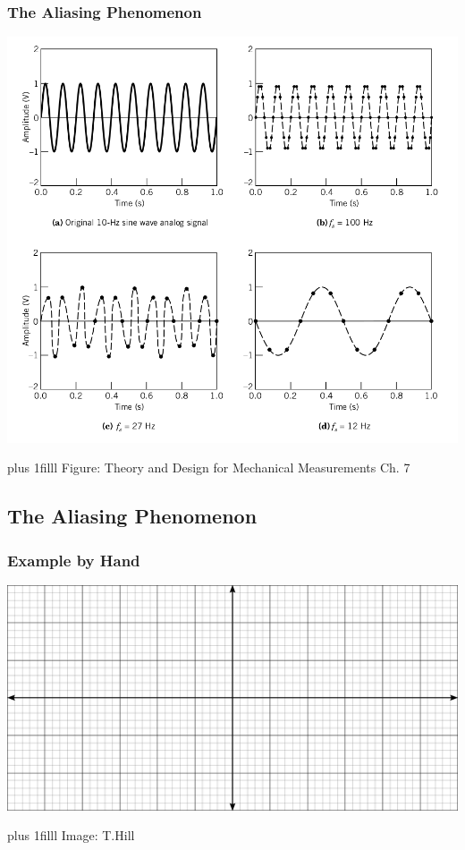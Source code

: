 \documentclass[fleqn]{beamer} %
\newcommand{\sectionIIIsubsectionIItitle}{The Aliasing Phenomenon}
\newcommand{\sectionIIIsubsectionIIItitle}{Example by Hand}
\newcommand{\btVFill}{\vskip0pt plus 1filll}
\begin{document}
			\begin{frame}
				\frametitle{\sectionIIIsubsectionIItitle}
				\bigskip
				\includegraphics[scale=.2]{images/aliasing_fig7_2.png}


				\btVFill
				\tiny{Figure: Theory and Design for Mechanical Measurements Ch. 7}	
					
			\end{frame}

		\subsection{\sectionIIIsubsectionIItitle}\label{sectionIIIsubsectionIII}

			\begin{frame}
				\frametitle{\sectionIIIsubsectionIIItitle}
				\bigskip
				\includegraphics[scale=.35]{images/cartesian_6x12.png}


				\btVFill
				\tiny{Image: T.Hill}		
		
			\end{frame}
\end{document}
